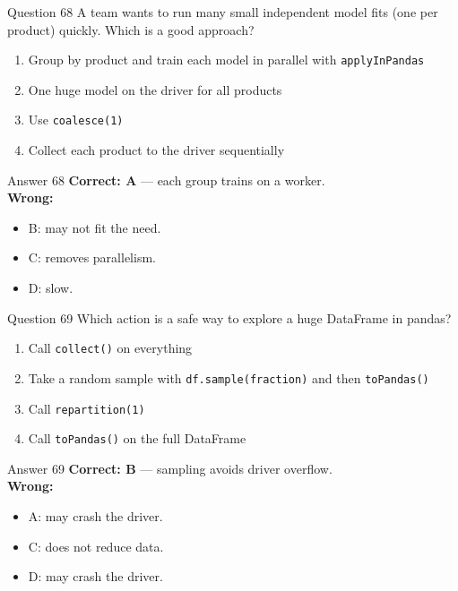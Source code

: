 \documentclass[aspectratio=169,11pt]{beamer}
\begin{document}
\begin{frame}{Question 68}
A team wants to run many small independent model fits (one per product) quickly. Which is a good approach?
\begin{enumerate}[label=\Alph*.]
\item Group by product and train each model in parallel with \texttt{applyInPandas}
\item One huge model on the driver for all products
\item Use \texttt{coalesce(1)}
\item Collect each product to the driver sequentially
\end{enumerate}
\end{frame}
\begin{frame}{Answer 68}
\textbf{Correct: A} --- each group trains on a worker.\\
\vspace{0.5em}
\textbf{Wrong:}
\begin{itemize}
\item B: may not fit the need.
\item C: removes parallelism.
\item D: slow.
\end{itemize}
\end{frame}

\begin{frame}{Question 69}
Which action is a safe way to explore a huge DataFrame in pandas?
\begin{enumerate}[label=\Alph*.]
\item Call \texttt{collect()} on everything
\item Take a random sample with \texttt{df.sample(fraction)} and then \texttt{toPandas()}
\item Call \texttt{repartition(1)}
\item Call \texttt{toPandas()} on the full DataFrame
\end{enumerate}
\end{frame}
\begin{frame}{Answer 69}
\textbf{Correct: B} --- sampling avoids driver overflow.\\
\vspace{0.5em}
\textbf{Wrong:}
\begin{itemize}
\item A: may crash the driver.
\item C: does not reduce data.
\item D: may crash the driver.
\end{itemize}
\end{frame}
\end{document}
